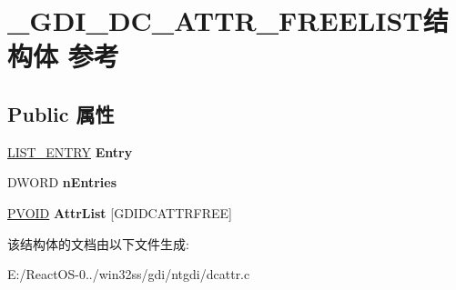 \hypertarget{struct___g_d_i___d_c___a_t_t_r___f_r_e_e_l_i_s_t}{}\section{\+\_\+\+G\+D\+I\+\_\+\+D\+C\+\_\+\+A\+T\+T\+R\+\_\+\+F\+R\+E\+E\+L\+I\+S\+T结构体 参考}
\label{struct___g_d_i___d_c___a_t_t_r___f_r_e_e_l_i_s_t}
\subsection*{Public 属性}
\begin{DoxyCompactItemize}
\item 
\mbox{\label{struct___g_d_i___d_c___a_t_t_r___f_r_e_e_l_i_s_t_ae5e7ba137c7e0aa77f7147091233e3b1}} 
\hyperlink{struct___l_i_s_t___e_n_t_r_y}{L\+I\+S\+T\+\_\+\+E\+N\+T\+RY} {\bfseries Entry}
\item 
\mbox{\label{struct___g_d_i___d_c___a_t_t_r___f_r_e_e_l_i_s_t_a1e35b485128d8182d33e563eba1001a4}} 
D\+W\+O\+RD {\bfseries n\+Entries}
\item 
\mbox{\label{struct___g_d_i___d_c___a_t_t_r___f_r_e_e_l_i_s_t_ac2793be9a45f9bfc37369aeeb00d11f3}} 
\hyperlink{interfacevoid}{P\+V\+O\+ID} {\bfseries Attr\+List} \mbox{[}G\+D\+I\+D\+C\+A\+T\+T\+R\+F\+R\+EE\mbox{]}
\end{DoxyCompactItemize}


该结构体的文档由以下文件生成\+:\begin{DoxyCompactItemize}
\item 
E\+:/\+React\+O\+S-\/0../win32ss/gdi/ntgdi/dcattr.\+c\end{DoxyCompactItemize}
